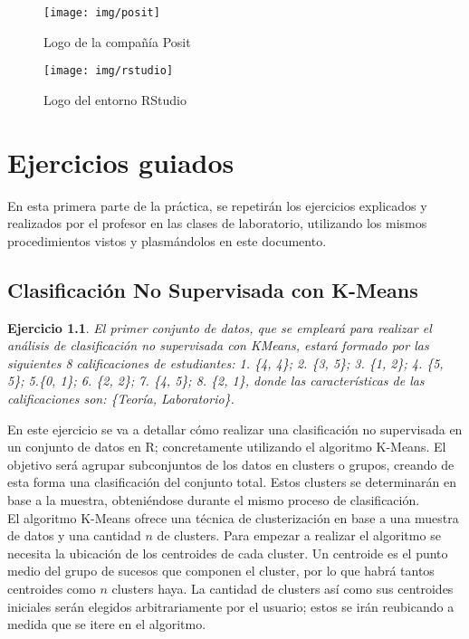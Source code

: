 \documentclass[12pt]{report}\usepackage[]{graphicx}\usepackage[dvipsnames]{xcolor}
\newtheorem{exercise}{Ejercicio}[section]
\begin{document}
	\begin{figure}[H]
		\centering
		\texttt{[image: img/posit]}
		\caption{Logo de la compañía Posit}
		\label{fig:logo_posit}
	\end{figure}
	
	\begin{figure}[H]
		\centering
		\texttt{[image: img/rstudio]}
		\caption{Logo del entorno RStudio}
		\label{fig:logo_rstudio}
	\end{figure}
	
	\chapter{Ejercicios guiados}\pagestyle{fancy}
	
	En esta primera parte de la práctica, se repetirán los ejercicios explicados y realizados por el profesor en las clases de laboratorio, utilizando los mismos procedimientos vistos y plasmándolos en este documento.
	
	\section{Clasificación No Supervisada con K-Means}
	
	\begin{exercise}
		El primer conjunto de datos, que se empleará para realizar el análisis de clasificación no supervisada con KMeans, estará formado por las siguientes 8 calificaciones de estudiantes: 1. \{4, 4\}; 2. \{3, 5\}; 3. \{1, 2\}; 4. \{5, 5\}; 5.\{0, 1\}; 6. \{2, 2\}; 7. \{4, 5\}; 8. \{2, 1\}, donde las características de las calificaciones son: \{Teoría, Laboratorio\}.
	\end{exercise}
	
	En este ejercicio se va a detallar cómo realizar una clasificación no supervisada en un conjunto de datos en R; concretamente utilizando el algoritmo K-Means. El objetivo será agrupar subconjuntos de los datos en clusters o grupos, creando de esta forma una clasificación del conjunto total. Estos clusters se determinarán en base a la muestra, obteniéndose durante el mismo proceso de clasificación.\\
	
	El algoritmo K-Means ofrece una técnica de clusterización en base a una muestra de datos y una cantidad $n$ de clusters. Para empezar a realizar el algoritmo se necesita la ubicación de los centroides de cada cluster. Un centroide es el punto medio del grupo de sucesos que componen el cluster, por lo que habrá tantos centroides como $n$ clusters haya. La cantidad de clusters así como sus centroides iniciales serán elegidos arbitrariamente por el usuario; estos se irán reubicando a medida que se itere en el algoritmo. \\
	
\end{document}
